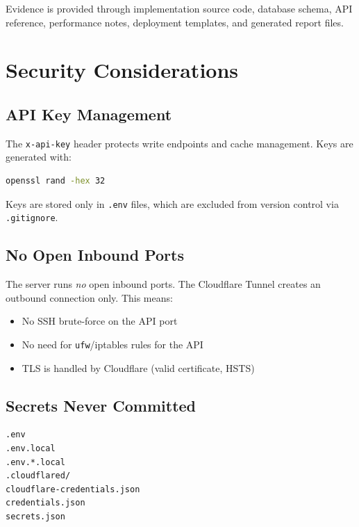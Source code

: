 \documentclass[12pt,a4paper]{report}
\begin{document}
Evidence is provided through implementation source code, database schema, API reference, performance notes, deployment templates, and generated report files.

\chapter{Security Considerations}

\section{API Key Management}

The \texttt{x-api-key} header protects write endpoints and cache management. Keys are generated with:

\begin{lstlisting}[language=bash]
openssl rand -hex 32
\end{lstlisting}

Keys are stored only in \texttt{.env} files, which are excluded from version control via \texttt{.gitignore}.

\section{No Open Inbound Ports}

The server runs \emph{no} open inbound ports. The Cloudflare Tunnel creates an outbound connection only. This means:
\begin{itemize}[nosep]
    \item No SSH brute-force on the API port
    \item No need for \texttt{ufw}/iptables rules for the API
    \item TLS is handled by Cloudflare (valid certificate, HSTS)
\end{itemize}

\section{Secrets Never Committed}

\begin{lstlisting}[caption=.gitignore entries protecting credentials]
.env
.env.local
.env.*.local
.cloudflared/
cloudflare-credentials.json
credentials.json
secrets.json
\end{lstlisting}
\end{document}
